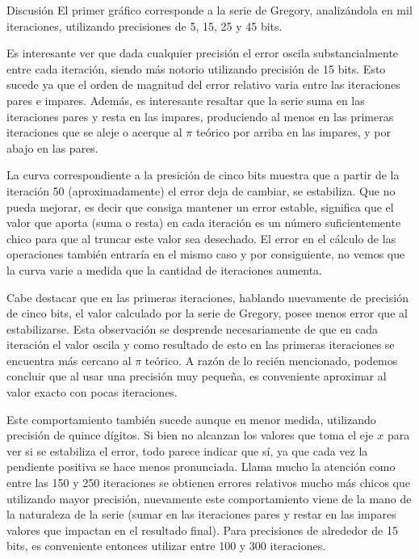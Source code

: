 \begin{section}{Discusión}
	El primer gráfico corresponde a la serie de Gregory, analizándola en mil iteraciones, utilizando precisiones de 5, 15, 25 y 45 bits. 
	
	Es interesante ver que dada cualquier precisión el error oscila substancialmente entre cada iteración, siendo más notorio utilizando precisión de 15 bits. Esto sucede ya que el orden de magnitud del error relativo varia entre las iteraciones pares e impares. Además, es interesante resaltar que la serie suma en las iteraciones pares y resta en las impares, produciendo al menos en las primeras iteraciones que se aleje o acerque al $\pi$ teórico por arriba en las impares, y por abajo en las pares.
	
	La curva correspondiente a la presición de cinco bits muestra que a partir de la iteración 50 (aproximadamente) el error deja de cambiar, se estabiliza. Que no pueda mejorar, es decir que consiga mantener un error estable, significa que el valor que aporta (suma o resta) en cada iteración es un número suficientemente chico para que al truncar este valor sea desechado. El error en el cálculo de las operaciones también entraría en el mismo caso y por consiguiente, no vemos que la curva varie a medida que la cantidad de iteraciones aumenta.
	
	Cabe destacar que en las primeras iteraciones, hablando nuevamente de precisión de cinco bits, el valor calculado por la serie de Gregory, posee menos error que al estabilizarse. Esta observación se desprende necesariamente de que en cada iteración el valor oscila y como resultado de esto en las primeras iteraciones se encuentra más cercano al $\pi$ teórico. A razón de lo recién mencionado, podemos concluir que al usar una precisión muy pequeña, es conveniente aproximar al valor exacto con pocas iteraciones.
	
	Este comportamiento también sucede aunque en menor medida, utilizando precisión de quince dígitos. Si bien no alcanzan los valores que toma el eje $x$ para ver si se estabiliza el error, todo parece indicar que sí, ya que cada vez la pendiente positiva se hace menos pronunciada. Llama mucho la atención como entre las 150 y 250 iteraciones se obtienen errores relativos mucho más chicos que utilizando mayor precisión, nuevamente este comportamiento viene de la mano de la naturaleza de la serie (sumar en las iteraciones pares y restar en las impares valores que impactan en el resultado final). Para precisiones de alrededor de 15 bits, es conveniente entonces utilizar entre 100 y 300 iteraciones.


\end{section}
